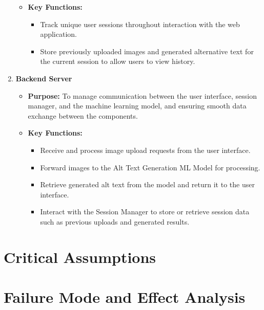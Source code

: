 \documentclass{article}
\begin{document}
\begin{enumerate}
\begin{itemize}
        \item \textbf{Key Functions:}
        \begin{itemize}
            \item Track unique user sessions throughout interaction with the web application.
            \item Store previously uploaded images and generated alternative text for the current session to allow users to view history.
        \end{itemize}
    \end{itemize}
    \item \textbf{Backend Server}
    \begin{itemize}
        \item \textbf{Purpose:} To manage communication between the user interface, session manager, and the machine learning model, and ensuring smooth data exchange between the components.
        \item \textbf{Key Functions:}
        \begin{itemize}
            \item Receive and process image upload requests from the user interface.
            \item Forward images to the Alt Text Generation ML Model for processing.
            \item Retrieve generated alt text from the model and return it to the user interface. 
            \item Interact with the Session Manager to store or retrieve session data such as previous uploads and generated results.
        \end{itemize}
    \end{itemize}
\end{enumerate}
\section{Critical Assumptions}


\section{Failure Mode and Effect Analysis}
\end{document}

